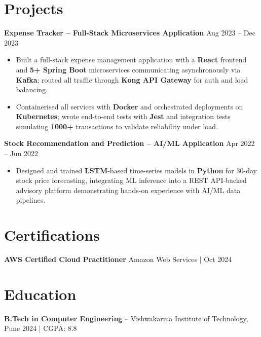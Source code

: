 \documentclass[letterpaper,10pt]{article}
\begin{document}
\section*{Projects}

\textbf{Expense Tracker -- Full-Stack Microservices Application} \hfill Aug 2023 -- Dec 2023
\begin{itemize}[leftmargin=*]
    \item Built a full-stack expense management application with a \textbf{React} frontend and \textbf{5+ Spring Boot} microservices communicating asynchronously via \textbf{Kafka}; routed all traffic through \textbf{Kong API Gateway} for auth and load balancing.
    \item Containerised all services with \textbf{Docker} and orchestrated deployments on \textbf{Kubernetes}; wrote end-to-end tests with \textbf{Jest} and integration tests simulating \textbf{1000+} transactions to validate reliability under load.
\end{itemize}

\textbf{Stock Recommendation and Prediction -- AI/ML Application} \hfill Apr 2022 -- Jun 2022
\begin{itemize}[leftmargin=*]
    \item Designed and trained \textbf{LSTM}-based time-series models in \textbf{Python} for 30-day stock price forecasting, integrating ML inference into a REST API-backed advisory platform demonstrating hands-on experience with AI/ML data pipelines.
\end{itemize}

\section*{Certifications}
\textbf{AWS Certified Cloud Practitioner} \hfill Amazon Web Services \;|\; Oct 2024

\section*{Education}
\textbf{B.Tech in Computer Engineering} -- Vishwakarma Institute of Technology, Pune \hfill 2024 \;|\; CGPA: 8.8
\end{document}
